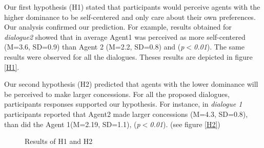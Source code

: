\documentclass{llncs}
\begin{document}
				\par Our first hypothesis (H1) stated that participants would perceive agents with the higher dominance to be self-centered and only care about their own preferences. Our analysis confirmed our prediction. For example, results obtained for \textit{dialogue2} showed that in average Agent1 was perceived as more self-centered (M=3.6, SD=0.9) than Agent 2 (M=2.2, SD=0.8) and (\textit{p$<$0.01}). The same results were observed for all the dialogues. Theses results are depicted in figure \ref{H1}.
				
				\par Our second hypothesis (H2) predicted that agents with the lower dominance will be perceived to make larger concessions. For all the proposed dialogues, participants responses supported our hypothesis. 
				For instance, in \textit{dialogue 1} participants reported that Agent2 made larger concessions (M=4.3, SD=0.8), than did the Agent 1(M=2.19, SD=1.1), (\textit{p$<$0.01}).  (see figure  \ref{H2})
				
							\begin{figure}[htb!]
					\setlength\fboxsep{0pt}\setlength\fboxrule{0.75pt}
					{
						\caption{Results of H1 and H2}
						
					}
				\end{figure}%
				
\end{document}
